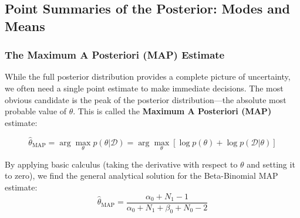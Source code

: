 \documentclass{article}
\begin{document}
\begin{table}[htbp]
\centering
\small
\renewcommand{\arraystretch}{1.3}
\caption{Parameter Updates and Trajectory Within the Beta-Binomial Architecture}
\label{tab:bayesian_beta_update}
\end{table}

\subsection{Point Summaries of the Posterior: Modes and Means}

\subsubsection{The Maximum A Posteriori (MAP) Estimate}
While the full posterior distribution provides a complete picture of uncertainty, we often need a single point estimate to make immediate decisions. The most obvious candidate is the peak of the posterior distribution—the absolute most probable value of $\theta$. This is called the \textbf{Maximum A Posteriori (MAP)} estimate:

\begin{equation}
\hat{\theta}_{\text{MAP}} = \arg\max_{\theta} p(\theta|\mathcal{D}) = \arg\max_{\theta} \left[ \log p(\theta) + \log p(\mathcal{D}|\theta) \right]
\end{equation}

By applying basic calculus (taking the derivative with respect to $\theta$ and setting it to zero), we find the general analytical solution for the Beta-Binomial MAP estimate:
\begin{equation}
\hat{\theta}_{\text{MAP}} = \frac{\alpha_0 + N_1 - 1}{\alpha_0 + N_1 + \beta_0 + N_0 - 2}
\end{equation}
\end{document}
